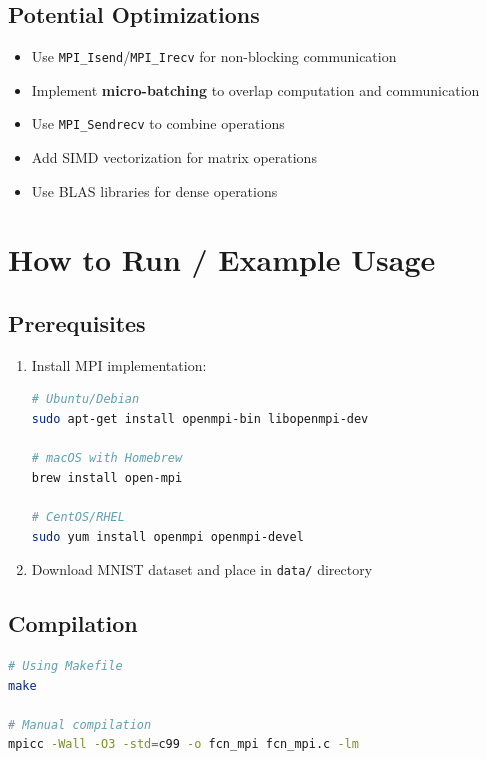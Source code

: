 \documentclass[11pt,a4paper]{article}
\begin{document}
\subsection{Potential Optimizations}

\begin{itemize}
    \item Use \texttt{MPI\_Isend}/\texttt{MPI\_Irecv} for non-blocking communication
    \item Implement \textbf{micro-batching} to overlap computation and communication
    \item Use \texttt{MPI\_Sendrecv} to combine operations
    \item Add SIMD vectorization for matrix operations
    \item Use BLAS libraries for dense operations
\end{itemize}

\section{How to Run / Example Usage}

\subsection{Prerequisites}

\begin{enumerate}
    \item Install MPI implementation:
    \begin{lstlisting}[language=bash]
# Ubuntu/Debian
sudo apt-get install openmpi-bin libopenmpi-dev

# macOS with Homebrew
brew install open-mpi

# CentOS/RHEL
sudo yum install openmpi openmpi-devel
    \end{lstlisting}
    
    \item Download MNIST dataset and place in \texttt{data/} directory
\end{enumerate}

\subsection{Compilation}

\begin{lstlisting}[language=bash, caption={Compilation commands}]
# Using Makefile
make

# Manual compilation
mpicc -Wall -O3 -std=c99 -o fcn_mpi fcn_mpi.c -lm
\end{lstlisting}
\end{document}
